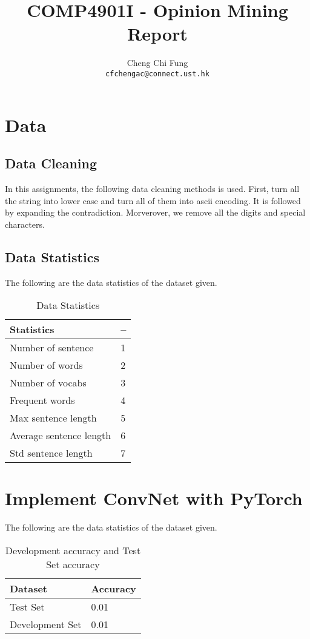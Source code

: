 \documentclass{article}
\title{COMP4901I - Opinion Mining Report}
\author{%
	Cheng Chi Fung \\
	\texttt{cfchengac@connect.ust.hk} \\
}
\begin{document}
\maketitle

\section{Data}

\subsection{Data Cleaning}
In this assignments, the following data cleaning methods is used. First, turn all the string into lower case and turn all of them into ascii encoding. It is followed by expanding the contradiction. Morverover, we remove all the digits and special characters.

\subsection{Data Statistics}
The following are the data statistics of the dataset given.

\begin{table}[htb]
	\caption{Data Statistics}
	\label{sample-table}
	\centering
	\begin{tabular}{ll}
		\toprule
		\cmidrule{1-2}
		Statistics & --  \\
		\midrule
		Number of sentence & 1 \\
		Number of words & 2  \\
		Number of vocabs & 3 \\
		Frequent words & 4  \\
		Max sentence length & 5  \\
		Average sentence length & 6  \\
		Std sentence length & 7  \\
		\bottomrule
	\end{tabular}
\end{table}

\section{Implement ConvNet with PyTorch}
The following are the data statistics of the dataset given.

\begin{table}[htb]
	\caption{Development accuracy and Test Set accuracy}
	\label{sample-table}
	\centering
	\begin{tabular}{ll}
		\toprule
		\cmidrule{1-2}
		Dataset &Accuracy\\
		\midrule
		Test Set & 0.01   \\
		Development Set & 0.01  \\
		\bottomrule
	\end{tabular}
\end{table}
\end{document}
